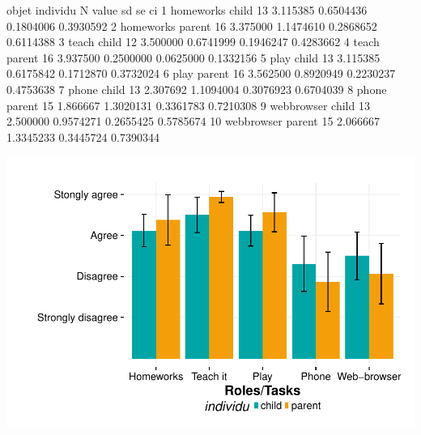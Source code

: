 \documentclass{article}
\begin{document}
\begin{Schunk}
\begin{Soutput}
        objet individu  N    value        sd        se        ci
1   homeworks    child 13 3.115385 0.6504436 0.1804006 0.3930592
2   homeworks   parent 16 3.375000 1.1474610 0.2868652 0.6114388
3       teach    child 12 3.500000 0.6741999 0.1946247 0.4283662
4       teach   parent 16 3.937500 0.2500000 0.0625000 0.1332156
5        play    child 13 3.115385 0.6175842 0.1712870 0.3732024
6        play   parent 16 3.562500 0.8920949 0.2230237 0.4753638
7       phone    child 13 2.307692 1.1094004 0.3076923 0.6704039
8       phone   parent 15 1.866667 1.3020131 0.3361783 0.7210308
9  webbrowser    child 13 2.500000 0.9574271 0.2655425 0.5785674
10 webbrowser   parent 15 2.066667 1.3345233 0.3445724 0.7390344
\end{Soutput}
\end{Schunk}
\includegraphics{interviews/interviews-plot_functionality_parent_enfant_bar}
\end{document}
